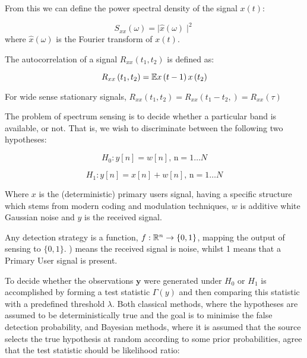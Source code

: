 From this we can define the power spectral density of the signal \(x\left(t\right)\):

\begin{definition}
\begin{equation}
S_{xx} \left(\omega\right) = \mid \hat{x}\left(\omega\right) \mid^2
\end{equation}
where \(\hat{x}\left(\omega\right)\) is the Fourier transform of \(x\left(t\right)\).
\end{definition}

\begin{definition}[Autcorrelation]
The autocorrelation of a signal \(R_{xx}\left(t_1, t_2\right)\) is defined as:

\begin{equation}
R_{xx}\left(t_1, t_2\right) = {\mathbb{E}}{x\left(t-1\right)x\left(t_2\right)}
\end{equation}

For wide sense stationary signals, \( R_{xx}\left(t_1, t_2\right) = R_{xx}\left(t_1 - t_2,\right) = R_{xx}\left(\tau\right) \)

\end{definition}

The problem of spectrum sensing \cite{yucek2009survey} is to decide whether a particular band is available, or not. That is, we wish to discriminate between the following two hypotheses:

\begin{equation}
H_{0}: y\left[n\right] = w\left[n\right] \text{, n} =  1 \ldots N 
\end{equation}
\label{h1}

\begin{equation}
H_{1}: y\left[n \right] = x\left[n\right] + w\left[n\right] \text{, n} =  1 \ldots N 
\end{equation}
\label{h2}

Where \(x\) is the (deterministic) primary users signal, having a specific structure which stems from modern coding and modulation techniques, \(w\) is additive white Gaussian noise and \(y\) is the received signal.

Any detection strategy is a function, \(f: {\mathbb{R}}^n \rightarrow \{0,1\}\), mapping the output of sensing to \(\{0, 1\}\). ) means the received signal is noise, whilst 1 means that a Primary User signal is present.

To decide whether the observations \(\textbf{y}\) were generated under \(\textit{H}_{0}\) or \(\textit{H}_{1}\) is accomplished by forming a test statistic \(\Gamma\left(y\right)\) and then comparing this statistic with a predefined threshold \(\lambda\). Both classical methods, where the hypotheses are assumed to be deterministically true and the goal is to minimise the false detection probability, and Bayesian methods, where it is assumed that the source selects the true hypothesis at random according to some prior probabilities, agree that the test statistic should be likelihood ratio:

